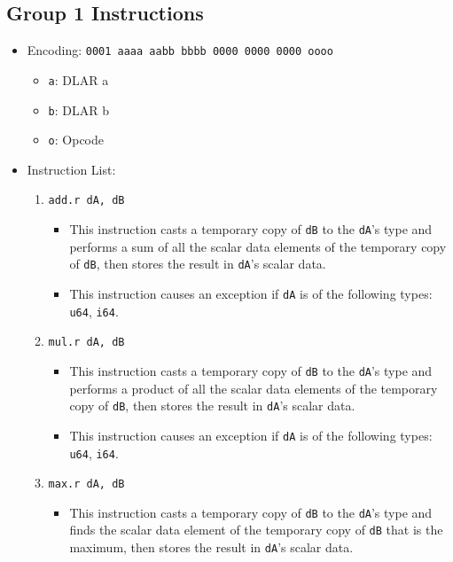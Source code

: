 \documentclass{article}
\begin{document}
	\subsection{Group 1 Instructions}
		\begin{itemize}
		\item Encoding: \texttt{0001 aaaa aabb bbbb  0000 0000 0000 oooo}
			\begin{itemize}
			\item \texttt{a}:  DLAR a
			\item \texttt{b}:  DLAR b
			\item \texttt{o}:  Opcode
			\end{itemize}

		\item Instruction List:
			\begin{enumerate}
			\item \texttt{add.r dA, dB}
				\begin{itemize}
				\item This instruction casts a temporary copy of
				\texttt{dB} to the \texttt{dA}'s type and performs a sum of
				all the scalar data elements of the temporary copy of
				\texttt{dB}, then stores the result in \texttt{dA}'s scalar
				data.

				\item This instruction causes an exception if \texttt{dA}
				is of the following types:  \texttt{u64}, \texttt{i64}.
				\end{itemize}
			\item \texttt{mul.r dA, dB}
				\begin{itemize}
				\item This instruction casts a temporary copy of
				\texttt{dB} to the \texttt{dA}'s type and performs a
				product of all the scalar data elements of the temporary
				copy of \texttt{dB}, then stores the result in
				\texttt{dA}'s scalar data.

				\item This instruction causes an exception if \texttt{dA}
				is of the following types:  \texttt{u64}, \texttt{i64}.
				\end{itemize}
			\item \texttt{max.r dA, dB}
				\begin{itemize}
				\item This instruction casts a temporary copy of
				\texttt{dB} to the \texttt{dA}'s type and finds the scalar
				data element of the temporary copy of \texttt{dB} that is
				the maximum, then stores the result in \texttt{dA}'s scalar
				data.


\end{itemize}
\end{enumerate}
\end{itemize}
\end{document}
